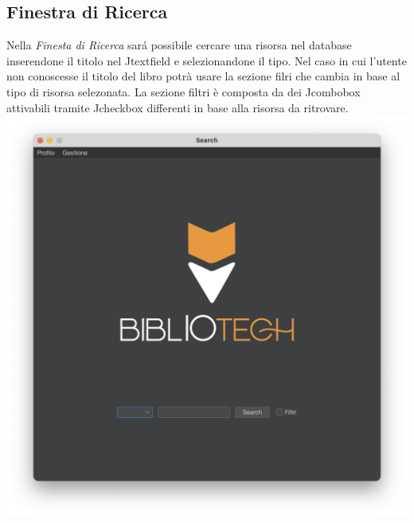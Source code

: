  \subsection{Finestra di Ricerca}
 Nella \textit{Finesta di Ricerca} sar\'a possibile cercare una risorsa nel database inserendone il titolo nel Jtextfield e 
 selezionandone il tipo. Nel caso in cui l'utente non conoscesse il titolo del libro potrà usare la sezione filri che cambia 
 in base al tipo di risorsa selezonata.
 La sezione filtri è composta da dei Jcombobox attivabili tramite Jcheckbox differenti in base alla risorsa da ritrovare.
 \includegraphics[scale=0.25, center]{Immagini/Schermate/Search/SearchPage.png}

